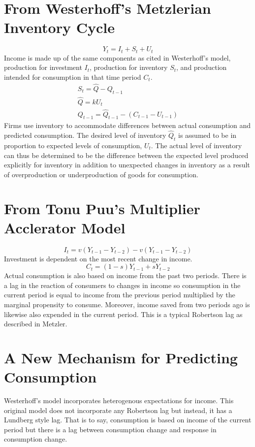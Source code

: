 \documentclass[]{article}
\begin{document}
\section*{From Westerhoff's Metzlerian Inventory Cycle}
	\begin{equation}
		Y_t=I_t+S_t+U_t
	\end{equation}
	Income is made up of the same components as cited in Westerhoff's model, production for investment $I_t$, production for inventory $S_t$, and production intended for consumption in that time period $C_t$.
	\begin{gather}
		S_t=\hat Q -Q_{t-1}\\
		\hat Q=k U_t\\
		Q_{t-1}=\hat Q_{t-1}-(C_{t-1}-U_{t-1})
	\end{gather}
	Firms use inventory to accommodate differences between actual consumption and predicted consumption. The desired level of inventory $\hat Q_t$ is assumed to be in proportion to expected levels of consumption, $U_t$. The actual level of inventory can thus be determined to be the difference between the expected level produced explicitly for inventory in addition to unexpected changes in inventory as a result of overproduction or underproduction of goods for consumption.
\section*{From Tonu Puu's Multiplier Acclerator Model}
	\begin{equation}
		I_t=v(Y_{t-1}-Y_{t-2})-v(Y_{t-1}-Y_{t-2})
	\end{equation}
	Investment is dependent on the most recent change in income.
	\begin{equation}
		C_t=(1-s)Y_{t-1}+sY_{t-2}
	\end{equation}
	Actual consumption is also based on income from the past two periods. There is a lag in the reaction of consumers to changes in income so consumption in the current period is equal to income from the previous period multiplied by the marginal propensity to consume. Moreover, income saved from two periods ago is likewise also expended in the current period. This is a typical Robertson lag as described in Metzler.
\section*{A New Mechanism for Predicting Consumption}
	Westerhoff's model incorporates heterogenous expectations for income. This original model does not incorporate any Robertson lag but instead, it has a Lundberg style lag. That is to say, consumption is based on income of the current period but there is a lag between consumption change and response in consumption change. 
\end{document}
